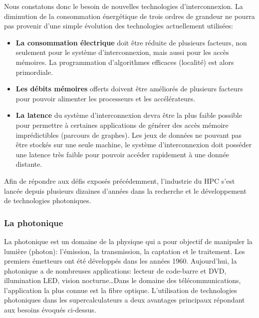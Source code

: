         Nous constatons donc le besoin de nouvelles technologies d'interconnexion. La diminution de la consommation énergétique de trois ordres de grandeur ne pourra pas provenir d'une simple évolution des technologies actuellement utilisées:
        \begin{itemize}
            \item \textbf{La consommation électrique} doit être réduite de plusieurs facteurs, non seulement pour le système d'interconnexion, mais aussi pour les accès mémoires. La programmation d'algorithmes efficaces (localité) est alors primordiale. 
            \item \textbf{Les débits mémoires} offerts doivent être améliorés de plusieurs facteurs pour pouvoir alimenter les processeurs et les accélérateurs. 
            \item \textbf{La latence} du système d'interconnexion devra être la plus faible possible pour permettre à certaines applications de générer des accès mémoire imprédictibles (parcours de graphes). Les jeux de données ne pouvant pas être stockés sur une seule machine, le système d'interconnexion doit posséder une latence très faible pour pouvoir accéder rapidement à une donnée distante.
        \end{itemize}
        Afin de répondre aux défis exposés précédemment, l'industrie du HPC s'est lancée depuis plusieurs dizaines d'années dans la recherche et le développement de technologies photoniques. 
    
    
    \subsubsection{La photonique}
    
        La photonique est un domaine de la physique qui a pour objectif de manipuler la lumière (photon): l'émission, la transmission, la captation et le traitement. Les premiers émetteurs ont été développés dans les années 1960. Aujourd'hui, la photonique a de nombreuses applications: lecteur de code-barre et DVD, illumination LED, vision nocturne\ldots Dans le domaine des télécommunications, l'application la plus connue est la fibre optique. L'utilisation de technologies photoniques dans les supercalculateurs a deux avantages principaux répondant aux besoins évoqués ci-dessus.
       
